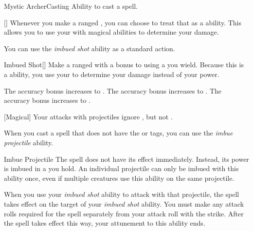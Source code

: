    \begin{feat}{Mystic Archer}{Casting}
        \featpre Ability to cast a spell.

        [] Whenever you make a ranged , you can choose to treat that as a  ability.
        This allows you to use your  with magical abilities to determine your damage.

         You can use the \textit{imbued shot} ability as a standard action.
        \begin{freeability}{Imbued Shot}[]
            Make a ranged  with a  bonus to  using a  you wield.
            Because this is a  ability, you use your   to determine your damage instead of your  power.

            \rankline
             The accuracy bonus increases to .
             The accuracy bonus increases to .
             The accuracy bonus increases to .
        \end{freeability}

        [Magical] Your attacks with projectiles ignore , but not .

         When you cast a spell that does not have the  or  tags,
            you can use the \textit{imbue projectile} ability.
        \begin{attuneability}{Imbue Projectile}
            \rankline
            The spell does not have its effect immediately.
            Instead, its power is imbued in a  you hold.
            An individual projectile can only be imbued with this ability once, even if multiple creatures use this ability on the same projectile.

            When you use your \textit{imbued shot} ability to attack with that projectile, the spell takes effect on the target of your \textit{imbued shot} ability.
            You must make any attack rolls required for the spell separately from your attack roll with the strike.
            After the spell takes effect this way, your attunement to this ability ends.
        \end{attuneability}


\end{feat}
